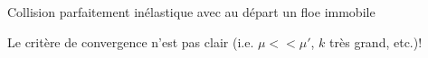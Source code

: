 \begin{frame}{Collision parfaitement inélastique avec au départ un floe immobile}
{{            %
            \vspace*{-0.1cm}
			\small
            \begin{tcolorbox}[colback=red!5,colframe=red!50!black,arc=0mm,boxrule=0.1mm,title=Remarque]
                \vspace*{-0.1cm}
                    Le critère de convergence n'est pas clair (i.e. $\mu << \mu'$, $k$ très grand, etc.)!
                \vspace*{-0.1cm}
            \end{tcolorbox}
            \normalsize

        }

    }
    
\end{frame}



